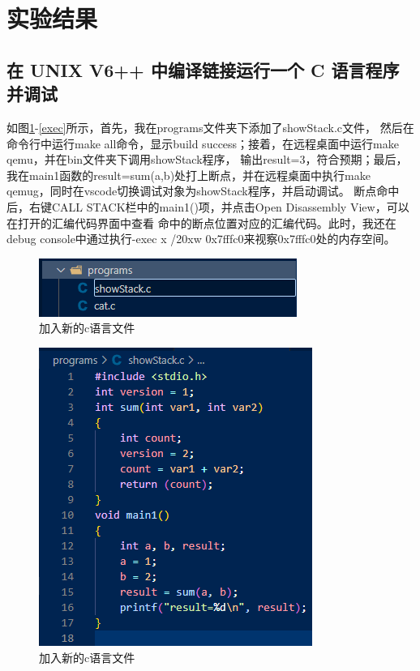 \section{实验结果}
\subsection{在 UNIX V6++ 中编译链接运行一个 C 语言程序并调试}
如图\ref{newFile}-\ref{exec}所示，首先，我在programs文件夹下添加了showStack.c文件，
然后在命令行中运行make all命令，显示build success；接着，在远程桌面中运行make qemu，并在bin文件夹下调用showStack程序，
输出result=3，符合预期；最后，我在main1函数的result=sum(a,b)处打上断点，并在远程桌面中执行make qemug，同时在vscode切换调试对象为showStack程序，并启动调试。
断点命中后，右键CALL STACK栏中的main1()项，并点击Open Disassembly View，可以在打开的汇编代码界面中查看
命中的断点位置对应的汇编代码。此时，我还在debug console中通过执行-exec x /20xw 0x7fffc0来视察0x7fffc0处的内存空间。
\begin{figure}[!htbp]
    \centering
    \includegraphics[scale=1]{figures/newFile.png}
    \caption{加入新的c语言文件}\label{newFile}
\end{figure}

\begin{figure}[!htbp]
    \centering
    \includegraphics[scale=1]{figures/newCode.png}
    \caption{加入新的c语言文件}\label{newCode}
\end{figure}

